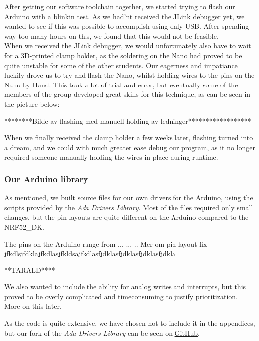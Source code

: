 \documentclass{article}
\begin{document}
After getting our software toolchain together, we started trying to flash our Arduino with a blinkin test. As we had'nt received the JLink debugger yet, we wanted to see if this was possible to accomplish using only USB. After spending way too many hours on this, we found that this would not be feasible.\\ 

When we received the JLink debugger, we would unfortunately also have to wait for a 3D-printed clamp holder, as the soldering on the Nano had proved to be quite unstable for some of the other students. Our eagerness and impatiance luckily drove us to try and flash the Nano, whilst holding wires to the pins on the Nano by Hand. This took a lot of trial and error, but eventually some of the members of the group developed great skills for this technique, as can be seen in the picture below:

********Bilde av flashing med manuell holding av ledninger******************

When we finally received the clamp holder a few weeks later, flashing turned into a dream, and we could with much greater ease debug our program, as it no longer required someone manually holding the wires in place during runtime. 


\subsubsection{Our Arduino library}

As mentioned, we built source files for our own drivers for the Arduino, using the scripts provided by the \textit{Ada Drivers Library}. Most of the files required only small changes, but the pin layouts are quite different on the Arduino compared to the NRF52\_DK. 

The pins on the Arduino range from ... ... .. Mer om pin layout fix jfkdlsjfdklajfkdlasjfkldsajfkdlasfjdklasfjdklasfjdklasfjdkla

**TARALD****

We also wanted to include the ability for analog writes and interrupts, but this proved to be overly complicated and timeconsuming to justify prioritization. More on this later. 

As the code is quite extensive, we have chosen not to include it in the appendices, but our fork of the \textit{Ada Drivers Library} can be seen on \href{https://github.com/Stykk-Gruppen/Ada_Drivers_Library}{GitHub}.
\end{document}
